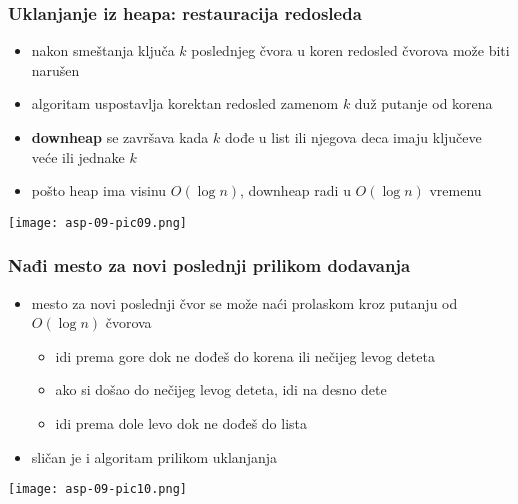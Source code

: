 \documentclass[compress]{beamer}
\begin{document}
\begin{frame}[fragile]
  \frametitle{Uklanjanje iz heapa: restauracija redosleda}
  \begin{itemize}
    \item nakon smeštanja ključa $k$ poslednjeg čvora u koren redosled čvorova
    može biti narušen
    \item algoritam  uspostavlja korektan redosled zamenom $k$
    duž putanje od korena
    \item \textbf{downheap} se završava kada $k$ dođe u list ili njegova
    deca imaju ključeve veće ili jednake $k$
    \item pošto heap ima visinu $O(\log n)$, downheap radi u $O(\log n)$ vremenu
  \end{itemize}
  \begin{center}
    \texttt{[image: asp-09-pic09.png]}
  \end{center}
\end{frame}

\begin{frame}[fragile]
  \frametitle{Nađi mesto za novi poslednji prilikom dodavanja}
  \begin{itemize}
    \item mesto za novi poslednji čvor se može naći prolaskom kroz putanju od
    $O(\log n)$ čvorova
    \begin{itemize}
      \item idi prema gore dok ne dođeš do korena ili nečijeg levog deteta
      \item ako si došao do nečijeg levog deteta, idi na desno dete
      \item idi prema dole levo dok ne dođeš do lista
    \end{itemize}
    \item sličan je i algoritam prilikom uklanjanja
  \end{itemize}
  \begin{center}
    \texttt{[image: asp-09-pic10.png]}
  \end{center}
\end{frame}
\end{document}
